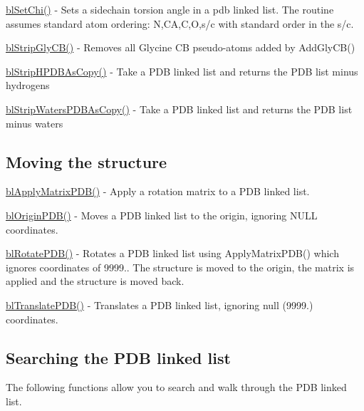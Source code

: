 \begin{DoxyItemize}
\item \hyperlink{pdb_8h_afe0ac1870975612e3fe9f731e038425f}{bl\-Set\-Chi()} -\/ Sets a sidechain torsion angle in a pdb linked list. The routine assumes standard atom ordering\-: N,C\-A,C,O,s/c with standard order in the s/c.
\item \hyperlink{_gly_c_b_8c_adfc62e26d10e79cb158c96b78b3abbdc}{bl\-Strip\-Gly\-C\-B()} -\/ Removes all Glycine C\-B pseudo-\/atoms added by Add\-Gly\-C\-B()
\item \hyperlink{pdb_8h_afd543872026cab5d575c5b6400e7a630}{bl\-Strip\-H\-P\-D\-B\-As\-Copy()} -\/ Take a P\-D\-B linked list and returns the P\-D\-B list minus hydrogens
\item \hyperlink{pdb_8h_a01c758ef91cf12033273f524c87a0617}{bl\-Strip\-Waters\-P\-D\-B\-As\-Copy()} -\/ Take a P\-D\-B linked list and returns the P\-D\-B list minus waters
\end{DoxyItemize}

\subsection*{Moving the structure }


\begin{DoxyItemize}
\item \hyperlink{_ap_mat_p_d_b_8c_a43bfc4564d1d1530d0d04817835bfa39}{bl\-Apply\-Matrix\-P\-D\-B()} -\/ Apply a rotation matrix to a P\-D\-B linked list.
\item \hyperlink{_origin_p_d_b_8c_a00841413b2f8e980c82051f6ad393b17}{bl\-Origin\-P\-D\-B()} -\/ Moves a P\-D\-B linked list to the origin, ignoring N\-U\-L\-L coordinates.
\item \hyperlink{pdb_8h_a0f422dbe39a51ccb3271f2c017aaebc7}{bl\-Rotate\-P\-D\-B()} -\/ Rotates a P\-D\-B linked list using Apply\-Matrix\-P\-D\-B() which ignores coordinates of 9999.. The structure is moved to the origin, the matrix is applied and the structure is moved back.
\item \hyperlink{pdb_8h_af6517bcd8c81d7f086e0d9f4273e3e2c}{bl\-Translate\-P\-D\-B()} -\/ Translates a P\-D\-B linked list, ignoring null (9999.) coordinates.
\end{DoxyItemize}

\subsection*{Searching the P\-D\-B linked list }

The following functions allow you to search and walk through the P\-D\-B linked list.


